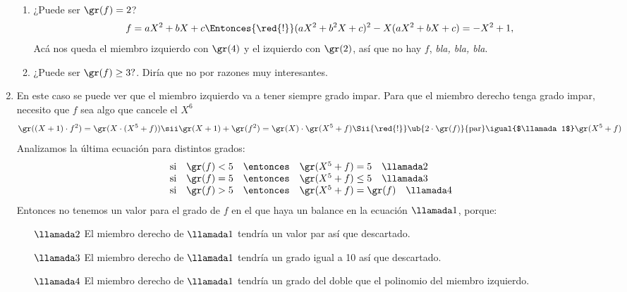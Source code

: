 \begin{enumerate}[label=\roman*)]
\begin{enumerate}[label=\tiny\faIcon{calculator}$_{\arabic*}$)]
          \item ¿Puede ser $\gr(f) = 2$?
                $$
                  f = aX^2 + bX + c \Entonces{\red{!}} (aX^2 + b^2X + c)^2  - X(aX^2 + bX + c) = -X^2 + 1,
                $$
                Acá nos queda el miembro izquierdo con $\gr(4)$ y el izquierdo con $\gr(2)$, así que no hay $f$, \textit{bla, bla, bla}.

          \item ¿Puede ser $\gr(f) \geq 3?$. Diría que no por razones muy interesantes.

        \end{enumerate}

  \item En este caso se puede ver que el miembro izquierdo va a tener siempre grado impar. Para que el miembro derecho tenga grado impar,
        necesito que $f$ sea algo que cancele el $X^6$
        $$
          \gr((X+1)\cdot f^2) = \gr(X\cdot (X^5 + f))
          \sii
          \gr(X+1) + \gr(f^2) = \gr(X) \cdot \gr(X^5 + f)
          \Sii{\red{!}}
          \ub{
            2 \cdot \gr(f)
          }{
            \text{par}
          }
          \igual{$\llamada1$}
          \gr(X^5 + f)
        $$
        Analizamos la última ecuación para distintos grados:
        $$
          \begin{array}{rccl}
            \text{si} & \gr(f) < 5 & \entonces & \gr(X^5 + f) = 5 \quad  \llamada2    \\
            \text{si} & \gr(f) = 5 & \entonces & \gr(X^5 + f) \leq 5 \quad \llamada3  \\
            \text{si} & \gr(f) > 5 & \entonces & \gr(X^5 + f) = \gr(f) \quad\llamada4
          \end{array}
        $$
        Entonces no tenemos un valor para el grado de $f$ en el que haya un balance en la ecuación $\llamada1$, porque:
        \begin{enumerate}
          \item[$\llamada2$] El miembro derecho de $\llamada1$ tendría un valor par
                así que descartado.

          \item[$\llamada3$] El miembro derecho de $\llamada1$ tendría un grado igual a 10 así que descartado.

          \item[$\llamada4$] El miembro derecho de $\llamada1$ tendría un grado del doble que el polinomio del miembro izquierdo.
        \end{enumerate}


\end{enumerate}
